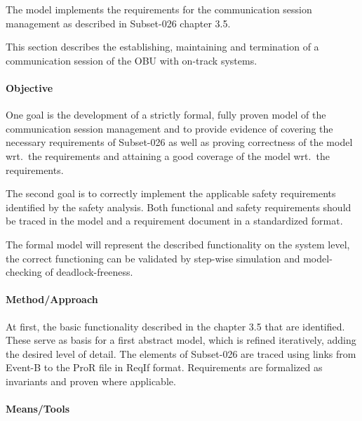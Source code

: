 The model implements the requirements for the communication session management
as described in Subset-026 chapter 3.5.

This section describes the establishing, maintaining and termination of a
communication session of the OBU with on-track systems.


\paragraph{Objective}


One goal is the development of a strictly formal, fully proven model of the
communication session management and to provide evidence of covering the
necessary requirements of Subset-026 as well as proving correctness of the model
wrt.\ the requirements and attaining a good coverage of the model wrt.\ the
requirements.

The second goal is to correctly implement the applicable safety requirements
identified by the safety analysis. Both functional and safety requirements
should be traced in the model and a requirement document in a standardized
format.

The formal model will represent the described functionality on the system level,
the correct functioning can be validated by step-wise simulation and
model-checking of deadlock-freeness.


\paragraph{Method/Approach}

At first, the basic functionality described in the chapter 3.5 that are
identified. These serve as basis for a first abstract model, which is refined
iteratively, adding the desired level of detail. The elements of Subset-026 are
traced using links from Event-B to the ProR file in ReqIf format. Requirements
are formalized as invariants and proven where applicable.

\paragraph{Means/Tools}


